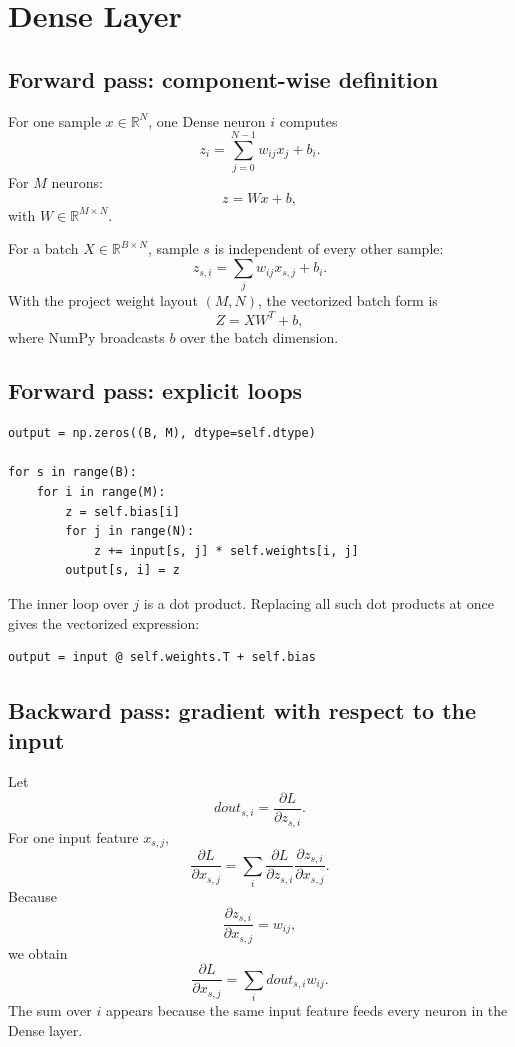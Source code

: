 \documentclass[11pt,a4paper]{article}
\newcommand{\pd}[2]{\frac{\partial #1}{\partial #2}}
\newcommand{\R}{\mathbb{R}}
\begin{document}
\newpage
\section{Dense Layer}

\subsection{Forward pass: component-wise definition}

For one sample $x\in\R^N$, one Dense neuron $i$ computes
\[
z_i=\sum_{j=0}^{N-1}w_{ij}x_j+b_i.
\]
For $M$ neurons:
\[
z=Wx+b,
\]
with $W\in\R^{M\times N}$.

For a batch $X\in\R^{B\times N}$, sample $s$ is independent of every other sample:
\[
z_{s,i}=\sum_j w_{ij}x_{s,j}+b_i.
\]
With the project weight layout $(M,N)$, the vectorized batch form is
\[
Z=XW^T+b,
\]
where NumPy broadcasts $b$ over the batch dimension.

\subsection{Forward pass: explicit loops}

\begin{lstlisting}
output = np.zeros((B, M), dtype=self.dtype)

for s in range(B):
    for i in range(M):
        z = self.bias[i]
        for j in range(N):
            z += input[s, j] * self.weights[i, j]
        output[s, i] = z
\end{lstlisting}

The inner loop over $j$ is a dot product. Replacing all such dot products at once gives the vectorized expression:

\begin{lstlisting}
output = input @ self.weights.T + self.bias
\end{lstlisting}

\subsection{Backward pass: gradient with respect to the input}

Let
\[
dout_{s,i}=\pd{L}{z_{s,i}}.
\]
For one input feature $x_{s,j}$,
\[
\pd{L}{x_{s,j}}
=
\sum_i
\pd{L}{z_{s,i}}
\pd{z_{s,i}}{x_{s,j}}.
\]
Because
\[
\pd{z_{s,i}}{x_{s,j}}=w_{ij},
\]
we obtain
\[
\boxed{
\pd{L}{x_{s,j}}=\sum_i dout_{s,i}w_{ij}
}.
\]
The sum over $i$ appears because the same input feature feeds every neuron in the Dense layer.
\end{document}
